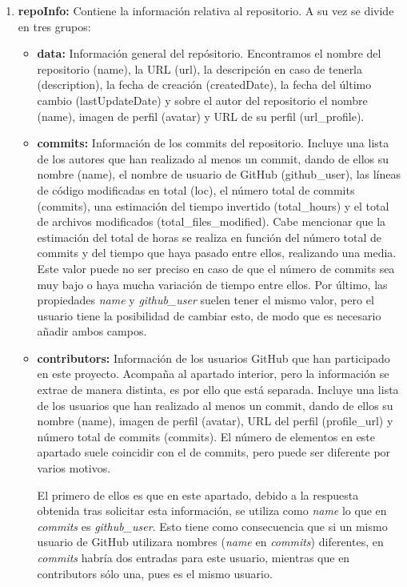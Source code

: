 \documentclass[a4paper, 12pt]{book}
\begin{document}
\begin{itemize}
\begin{enumerate}
        \item \textbf{repoInfo: } Contiene la información relativa al repositorio. A su vez se divide en tres grupos:
        \begin{itemize}
            \item \textbf{data: } Información general del repósitorio. Encontramos el nombre del repositorio (name), la URL (url), la descripción en caso de tenerla (description), la fecha de creación (createdDate), la fecha del último cambio (lastUpdateDate) y sobre el autor del repositorio el nombre (name), imagen de perfil (avatar) y URL de su perfil (url\_profile).
            \item \textbf{commits: } Información de los commits del repositorio. Incluye una lista de los autores que han realizado al menos un commit, dando de ellos su nombre (name), el nombre de usuario de GitHub (github\_user), las líneas de código modificadas en total (loc), el número total de commits (commits), una estimación del tiempo invertido (total\_hours) y el total de archivos modificados (total\_files\_modified). Cabe mencionar que la estimación del total de horas se realiza en función del número total de commits y del tiempo que haya pasado entre ellos, realizando una media. Este valor puede no ser preciso en caso de que el número de commits sea muy bajo o haya mucha variación de tiempo entre ellos. Por último, las propiedades \textit{name} y \textit{github\_user} suelen tener el mismo valor, pero el usuario tiene la posibilidad de cambiar esto, de modo que es necesario añadir ambos campos.
            \item \textbf{contributors: } Información de los usuarios GitHub que han participado en este proyecto. Acompaña al apartado interior, pero la información se extrae de manera distinta, es por ello que está separada. Incluye una lista de los usuarios que han realizado al menos un commit, dando de ellos su nombre (name), imagen de perfil (avatar), URL del perfil (profile\_url) y número total de commits (commits). El número de elementos en este apartado suele coincidir con el de commits, pero puede ser diferente por varios motivos. 
            
            El primero de ellos es que en este apartado, debido a la respuesta obtenida tras solicitar esta información, se utiliza como \textit{name} lo que en \textit{commits} es \textit{github\_user}. Esto tiene como consecuencia que si un mismo usuario de GitHub utilizara nombres (\textit{name} en \textit{commits}) diferentes, en \textit{commits} habría dos entradas para este usuario, mientras que en contributors sólo una, pues es el mismo usuario. 
            

\end{itemize}
\end{enumerate}
\end{itemize}
\end{document}
